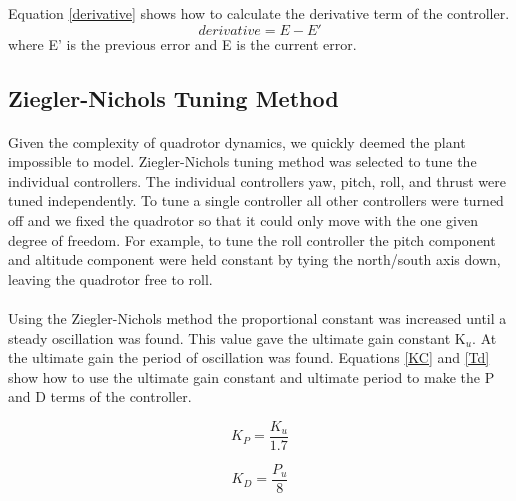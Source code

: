 Equation \ref{derivative} shows how to calculate the derivative term of the controller. 
\begin{equation}
derivative = E-E'
\label{derivative}
\end{equation}
where E’ is the previous error and E is the current error.

\subsection{Ziegler-Nichols Tuning Method\label{PID_Tune}}
\paragraph{}
Given the complexity of quadrotor dynamics, we quickly deemed the plant impossible to model.  Ziegler-Nichols tuning method was selected to tune the individual controllers. The individual controllers yaw, pitch, roll, and thrust were tuned independently. To tune a single controller all other controllers were turned off and we fixed the quadrotor so that it could only move with the one given degree of freedom.  For example, to tune the roll controller the pitch component and altitude component were held constant by tying the north/south axis down, leaving the quadrotor free to roll. 
\paragraph{}
Using the Ziegler-Nichols method the proportional constant was increased until a steady oscillation was found. This value gave the ultimate gain constant K$_u$.  At the ultimate gain the period of oscillation was found. Equations \ref{KC} and \ref{Td} show how to use the ultimate gain constant and ultimate period to make the P and D terms of the controller. 

\begin{equation}
K_P = \frac{K_u}{1.7}
\label{KC}
\end{equation}

\begin{equation}
K_D = \frac{P_u}{8}
\label{Td}
\end{equation}
